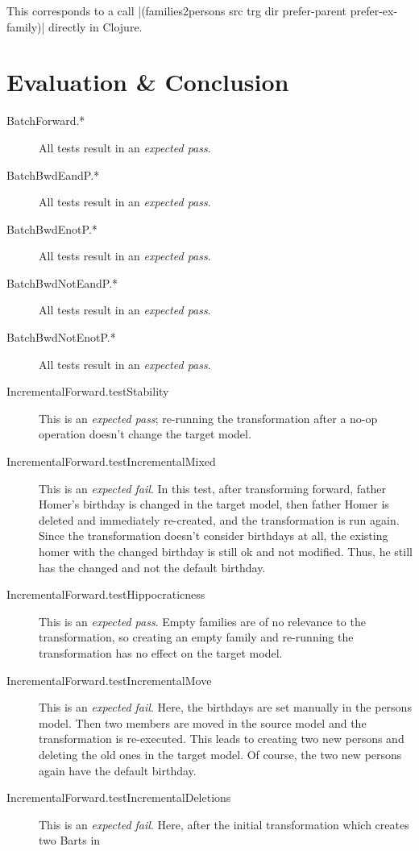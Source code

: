 \documentclass[a4paper]{article}
\newcommand{\code}{\clojureinline}
\begin{document}
This corresponds to a call
\code|(families2persons src trg dir prefer-parent prefer-ex-family)| directly
in Clojure.

\section{Evaluation \& Conclusion}
\label{sec:evaluation}

\begin{description}
\item[BatchForward.*] All tests result in an \emph{expected pass}.
\item[BatchBwdEandP.*] All tests result in an \emph{expected pass}.
\item[BatchBwdEnotP.*] All tests result in an \emph{expected pass}.
\item[BatchBwdNotEandP.*] All tests result in an \emph{expected pass}.
\item[BatchBwdNotEnotP.*] All tests result in an \emph{expected pass}.
\item[IncrementalForward.testStability] This is an \emph{expected pass};
  re-running the transformation after a no-op operation doesn't change the
  target model.
\item[IncrementalForward.testIncrementalMixed] This is an \emph{expected fail}.
  In this test, after transforming forward, father Homer's birthday is changed
  in the target model, then father Homer is deleted and immediately re-created,
  and the transformation is run again.  Since the transformation doesn't
  consider birthdays at all, the existing homer with the changed birthday is
  still ok and not modified.  Thus, he still has the changed and not the
  default birthday.
\item[IncrementalForward.testHippocraticness] This is an \emph{expected pass}.
  Empty families are of no relevance to the transformation, so creating an
  empty family and re-running the transformation has no effect on the target
  model.
\item[IncrementalForward.testIncrementalMove] This is an \emph{expected fail}.
  Here, the birthdays are set manually in the persons model.  Then two members
  are moved in the source model and the transformation is re-executed.  This
  leads to creating two new persons and deleting the old ones in the target
  model.  Of course, the two new persons again have the default birthday.
\item[IncrementalForward.testIncrementalDeletions] This is an \emph{expected
    fail}.  Here, after the initial transformation which creates two Barts in

\end{description}
\end{document}
